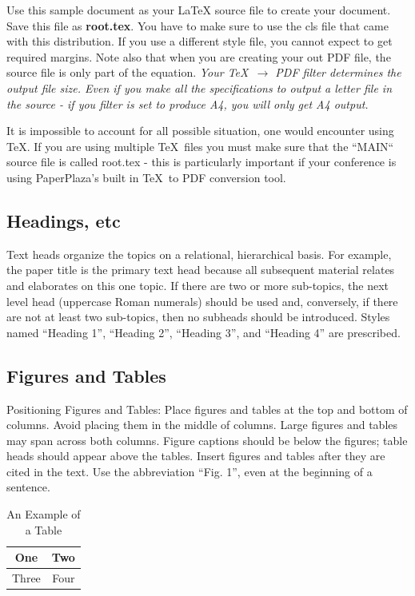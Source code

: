 \documentclass[spanish, letterpaper, 12 pt, conference]{ieeeconf}  %
\begin{document}
Use this sample document as your LaTeX source file to create your document. Save this file as {\bf root.tex}. You have to make sure to use the cls file that came with this distribution. If you use a different style file, you cannot expect to get required margins. Note also that when you are creating your out PDF file, the source file is only part of the equation. \emph{Your \TeX\ $\rightarrow$ PDF filter determines the output file size. Even if you make all the specifications to output a letter file in the source - if you filter is set to produce A4, you will only get A4 output.}

It is impossible to account for all possible situation, one would encounter using \TeX. If you are using multiple \TeX\ files you must make sure that the ``MAIN`` source file is called root.tex - this is particularly important if your conference is using PaperPlaza's built in \TeX\ to PDF conversion tool.

\subsection{Headings, etc}

Text heads organize the topics on a relational, hierarchical basis. For example, the paper title is the primary text head because all subsequent material relates and elaborates on this one topic. If there are two or more sub-topics, the next level head (uppercase Roman numerals) should be used and, conversely, if there are not at least two sub-topics, then no subheads should be introduced. Styles named ``Heading 1'', ``Heading 2'', ``Heading 3'', and ``Heading 4'' are prescribed.

\subsection{Figures and Tables}

Positioning Figures and Tables: Place figures and tables at the top and bottom of columns. Avoid placing them in the middle of columns. Large figures and tables may span across both columns. Figure captions should be below the figures; table heads should appear above the tables. Insert figures and tables after they are cited in the text. Use the abbreviation ``Fig. 1'', even at the beginning of a sentence.

\begin{table}[h]
\caption{An Example of a Table}
\label{table_example}
\begin{center}
\begin{tabular}{|c||c|}
\hline
One & Two\\
\hline
Three & Four\\
\hline
\end{tabular}
\end{center}
\end{table}
\end{document}
